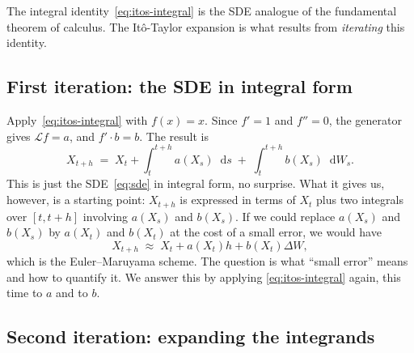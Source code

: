 \documentclass[11pt,a4paper]{article}
\theoremstyle{plain}
\theoremstyle{definition}
\theoremstyle{remark}
\newcommand{\dd}{\mathop{}\!\mathrm{d}}
\newcommand{\Lop}{\mathcal{L}}
\begin{document}
The integral identity~\eqref{eq:itos-integral} is the SDE analogue of
the fundamental theorem of calculus. The It\^o-Taylor expansion is what
results from \emph{iterating} this identity.

\subsection{First iteration: the SDE in integral form}

Apply~\eqref{eq:itos-integral} with $f(x) = x$. Since $f' = 1$ and
$f'' = 0$, the generator gives $\Lop f = a$, and
$f' \cdot b = b$. The result is
\begin{equation}
\label{eq:sde-integral}
X_{t+h} \;=\; X_t + \int_t^{t+h} a(X_s) \dd s
\;+\; \int_t^{t+h} b(X_s) \dd W_s.
\end{equation}
This is just the SDE~\eqref{eq:sde} in integral form, no surprise.
What it gives us, however, is a starting point: $X_{t+h}$ is expressed
in terms of $X_t$ plus two integrals over $[t, t+h]$ involving
$a(X_s)$ and $b(X_s)$. If we could replace $a(X_s)$ and $b(X_s)$ by
$a(X_t)$ and $b(X_t)$ at the cost of a small error, we would have
\begin{equation}
X_{t+h} \;\approx\; X_t + a(X_t) h + b(X_t) \Delta W,
\end{equation}
which is the Euler--Maruyama scheme. The question is what ``small
error'' means and how to quantify it. We answer this by applying
\eqref{eq:itos-integral} again, this time to $a$ and to $b$.

\subsection{Second iteration: expanding the integrands}
\label{sec:second-iteration}
\end{document}
